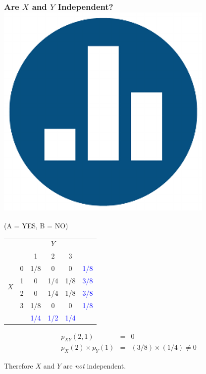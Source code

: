 \documentclass[handout]{beamer}
\begin{document}
\begin{frame}
\frametitle{Are $X$ and $Y$ Independent? \hfill \includegraphics[scale = 0.05]{./images/clicker}}
\alert{(A = YES, B = NO)}
\small
\begin{table}
\begin{tabular}{|cc|ccc|c|}
\hline
&&\multicolumn{3}{c|}{$Y$}&\\
&&1 & 2&3&\\
\hline
\multirow{4}{*}{$X$}
&0& \multicolumn{1}{|c}{\alert{1/8}} & \alert{0}& \alert{0}&\textcolor{blue}{1/8}\\
&1& \multicolumn{1}{|c}{\alert{0}} & \alert{1/4}&\alert{1/8}&\textcolor{blue}{3/8}\\
&2& \multicolumn{1}{|c}{\alert{0}} & \alert{1/4}&\alert{1/8}&\textcolor{blue}{3/8}\\
&3& \multicolumn{1}{|c}{\alert{1/8}} & \alert{0}&\alert{0}&\textcolor{blue}{1/8}\\
\hline
&&\textcolor{blue}{1/4}&\textcolor{blue}{1/2}&\textcolor{blue}{1/4}&\\
\hline
\end{tabular}
\end{table}

\pause

\begin{eqnarray*}
	p_{XY}(2,1) &=& 0\\ 
	p_X(2) \times p_Y(1) &=&  (3/8) \times (1/4) \neq 0
\end{eqnarray*}

\alert{Therefore $X$ and $Y$ are \emph{not} independent.}
\end{frame}
\end{document}
